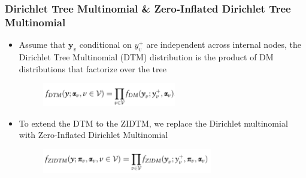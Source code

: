 \documentclass{beamer}
\begin{document}
\begin{frame}
\frametitle{Dirichlet Tree Multinomial \& Zero-Inflated Dirichlet Tree Multinomial}
\begin{itemize}
    \item Assume that $\boldsymbol y_v$ conditional on $y_v^+$ are independent across internal nodes, the Dirichlet Tree Multinomial (DTM) distribution is the product of DM distributions that factorize over the tree
    \begin{figure}[!htb]
  	\centering
  	\includegraphics[width=0.55\textwidth]{img/dtm.png}
  \end{figure}

    \item To extend the DTM to the ZIDTM, we replace the Dirichlet multinomial with Zero-Inflated Dirichlet Multinomial

    \begin{figure}[!htb]
  	\centering
  	\includegraphics[width=0.7\textwidth]{img/zidtm.png}
  \end{figure}
\end{itemize}
\end{frame}
\end{document}
